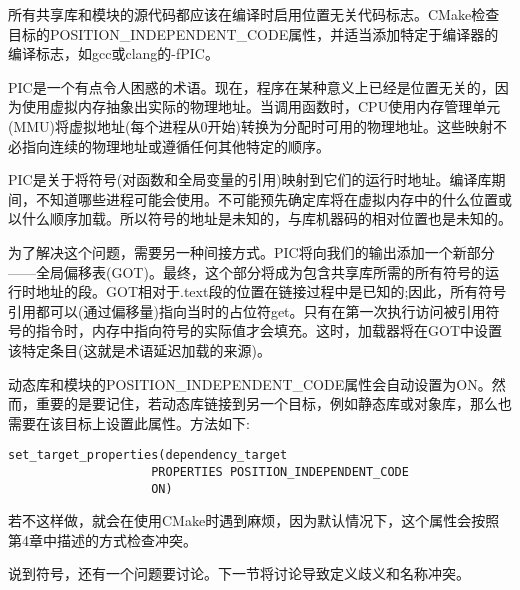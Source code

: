 
所有共享库和模块的源代码都应该在编译时启用位置无关代码标志。CMake检查目标的POSITION\_INDEPENDENT\_CODE属性，并适当添加特定于编译器的编译标志，如gcc或clang的-fPIC。

PIC是一个有点令人困惑的术语。现在，程序在某种意义上已经是位置无关的，因为使用虚拟内存抽象出实际的物理地址。当调用函数时，CPU使用内存管理单元(MMU)将虚拟地址(每个进程从0开始)转换为分配时可用的物理地址。这些映射不必指向连续的物理地址或遵循任何其他特定的顺序。

PIC是关于将符号(对函数和全局变量的引用)映射到它们的运行时地址。编译库期间，不知道哪些进程可能会使用。不可能预先确定库将在虚拟内存中的什么位置或以什么顺序加载。所以符号的地址是未知的，与库机器码的相对位置也是未知的。

为了解决这个问题，需要另一种间接方式。PIC将向我们的输出添加一个新部分——全局偏移表(GOT)。最终，这个部分将成为包含共享库所需的所有符号的运行时地址的段。GOT相对于.text段的位置在链接过程中是已知的;因此，所有符号引用都可以(通过偏移量)指向当时的占位符get。只有在第一次执行访问被引用符号的指令时，内存中指向符号的实际值才会填充。这时，加载器将在GOT中设置该特定条目(这就是术语延迟加载的来源)。

动态库和模块的POSITION\_INDEPENDENT\_CODE属性会自动设置为ON。然而，重要的是要记住，若动态库链接到另一个目标，例如静态库或对象库，那么也需要在该目标上设置此属性。方法如下:

\begin{lstlisting}[style=styleCMake]
set_target_properties(dependency_target
					PROPERTIES POSITION_INDEPENDENT_CODE
					ON)
\end{lstlisting}

若不这样做，就会在使用CMake时遇到麻烦，因为默认情况下，这个属性会按照第4章中描述的方式检查冲突。

说到符号，还有一个问题要讨论。下一节将讨论导致定义歧义和名称冲突。











